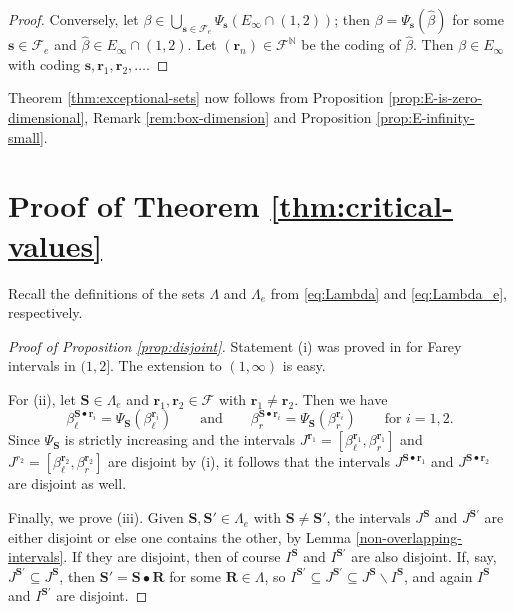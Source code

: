 \documentclass[12pt]{amsart}
\theoremstyle{definition}
\theoremstyle{remark}
\numberwithin{equation}{section}
\newcommand{\N}{\ensuremath{\mathbb{N}}}
\newcommand{\cF}{\mathcal{F}}
\newcommand{\s}{ {\mathbf{s}}}
\newcommand{\cs}{ {\mathbf{S}}}
\renewcommand{\r}{ {\mathbf{r}}}
\newcommand{\f}{\infty}
\newcommand{\La}{\Lambda}
\begin{document}
{\begin{proof}
Conversely, let $\beta\in \bigcup_{\s\in\cF_e} \Psi_\s(E_\f\cap(1,2))$; then $\beta=\Psi_\s(\hat{\beta})$ for some $\s\in\cF_e$ and $\hat{\beta}\in E_\f\cap(1,2)$. Let $(\r_n)\in\cF^\N$ be the coding of $\hat{\beta}$. Then $\beta\in E_\f$ with coding $\s,\r_1,\r_2, \ldots$. %
\end{proof}

Theorem \ref{thm:exceptional-sets} now follows from Proposition \ref{prop:E-is-zero-dimensional}, Remark \ref{rem:box-dimension} and Proposition \ref{prop:E-infinity-small}.


\section{Proof of Theorem \ref{thm:critical-values}} \label{sec:critical-values-proof}

Recall the definitions of the sets $\Lambda$ and $\Lambda_e$ from \eqref{eq:Lambda} and \eqref{eq:Lambda_e}, respectively.


\begin{proof}[Proof of Proposition \ref{prop:disjoint}]
Statement (i) was proved in \cite[Proposition 4.7]{Kalle-Kong-Langeveld-Li-18} for Farey intervals in $(1,2]$. The extension to $(1,\f)$ is easy.

For (ii), let $\cs\in\La_e$ and $\r_1,\r_2\in\cF$ with $\r_1\neq \r_2$. Then we have 
\[
\beta_\ell^{\cs\bullet\r_i}=\Psi_\cs(\beta_\ell^{\r_i}) \qquad\mbox{and}\qquad \beta_r^{\cs\bullet\r_i}=\Psi_\cs(\beta_r^{\r_i}) \qquad\mbox{for $i=1,2$}.
\]
Since $\Psi_\cs$ is strictly increasing and the intervals $J^{\r_1}=[\beta_\ell^{\r_1},\beta_r^{\r_1}]$ and $J^{r_2}=[\beta_\ell^{\r_2},\beta_r^{\r_2}]$ are disjoint by (i), it follows that the intervals $J^{\cs\bullet\r_1}$ and $J^{\cs\bullet\r_2}$ are disjoint as well.

Finally, we prove (iii). Given $\cs,\cs'\in\La_e$ with $\cs\neq\cs'$, the intervals $J^\cs$ and $J^{\cs'}$ are either disjoint or else one contains the other, by Lemma \ref{non-overlapping-intervals}. If they are disjoint, then of course $I^\cs$ and $I^{\cs'}$ are also disjoint. If, say, $J^{\cs'}\subseteq J^\cs$, then $\cs'=\cs\bullet \mathbf{R}$ for some $\mathbf{R}\in\La$, so $I^{\cs'}\subseteq J^{\cs'}\subseteq J^\cs\backslash I^\cs$, and again $I^\cs$ and $I^{\cs'}$ are disjoint.
\end{proof}

}
\end{document}
